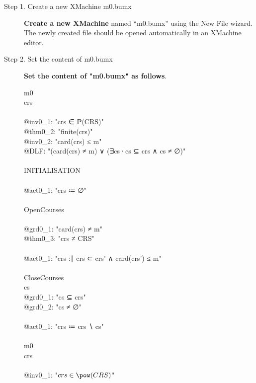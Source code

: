 \begin{description}
\item[Step 1. Create a new XMachine m0.bumx] \textbf{Create a new XMachine} named ``m0.bumx'' using the New File wizard. The newly created file should be opened automatically in an XMachine editor.

\item[Step 2. Set the content of m0.bumx] \textbf{Set the content of "m0.bumx" as follows}.
  \begin{center}
    \begin{Bcode}
      \ifplastex
      \Bmachine{} m0 \\
      \Bvariables{} crs \\
      \Binvariants \\
      @inv0_1: "crs ∈ ℙ(CRS)"\\
      @thm0_2: "finite(crs)" \Btheorem \\
      @inv0_2: "card(crs) ≤ m" \\
      @DLF: "(card(crs) ≠ m) ∨ (∃cs·cs ⊆ crs ∧ cs ≠ ∅)" \\
      \Bevents\\
      INITIALISATION\\
      \Bbegin \\
      @act0_1: "crs ≔ ∅"\\
      \Bend\\
      OpenCourses\\
      \Bwhen\\
      @grd0_1: "card(crs) ≠ m" \\
      @thm0_3: "crs ≠ CRS" \Btheorem \\
      \Bthen\\
      @act0_1: "crs :∣ crs ⊂ crs' ∧ card(crs') ≤ m"\\
      \Bend\\
      CloseCourses \Banticipated\\
      \Bany{} cs \Bwhere\\
      @grd0_1: "cs ⊆ crs"\\
      @grd0_2: "cs ≠ ∅"\\
      \Bthen\\
      @act0_1: "crs ≔ crs ∖ cs"\\
      \Bend\\
      \Bend
      \else
      \Bmachine{} m0 \\
      \Bvariables{} crs \\
      \Binvariants \\
      \Btab @inv0\_1: "\(crs \in \pow(CRS)\)"\\

\end{Bcode}
\end{center}
\end{description}
